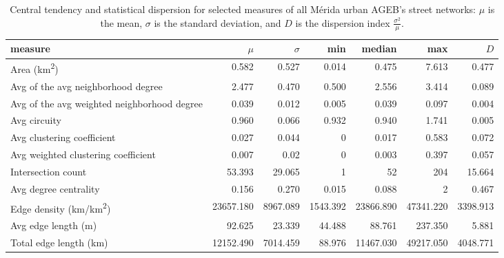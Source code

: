 \begin{table*}[htbp]
	\centering
	\caption{Central tendency and statistical dispersion for selected measures of all Mérida urban AGEB's street networks: $\mu$ is the mean, $\sigma$ is the standard deviation, and $D$ is the dispersion index $\frac{\sigma ^ 2}{\mu}$.}
	\label{tab:measures_urban_agebs}
	\small
	\begin{tabular}{ l r r r r r r }
		\toprule
		measure                                          & $\mu$          & $\sigma$       & min            & median         & max            & $D$            \\
		\midrule
		Area (km\textsuperscript{2})                     & 0.582        & 0.527        & 0.014         & 0.475        & 7.613       & 0.477       \\
		Avg of the avg neighborhood degree               & 2.477          & 0.470          & 0.500          & 2.556          & 3.414          & 0.089          \\
		Avg of the avg weighted neighborhood degree      & 0.039          & 0.012          & 0.005          & 0.039          & 0.097          & 0.004          \\
		Avg circuity                                     & 0.960          & 0.066          & 0.932          & 0.940          & 1.741          & 0.005 \\
		Avg clustering coefficient                       & 0.027          & 0.044          & 0          & 0.017          & 0.583          & 0.072          \\
		Avg weighted clustering coefficient              & 0.007          & 0.02          & 0 & 0.003          & 0.397          & 0.057 \\
		Intersection count                               & 53.393          & 29.065          & 1            & 52           & 204         & 15.664      \\
		Avg degree centrality                            & 0.156          & 0.270          & 0.015 & 0.088          & 2          & 0.467          \\
		Edge density (km/km\textsuperscript{2})          & 23657.180         & 8967.089          & 1543.392          & 23866.890         & 47341.220         & 3398.913          \\
		Avg edge length (m)                              & 92.625        & 23.339         & 44.488        & 88.761        & 237.350        & 5.881          \\
		Total edge length (km)                           & 12152.490           & 7014.459          & 88.976            & 11467.030           & 49217.050         & 4048.771      \\

\end{tabular}
\end{table*}
